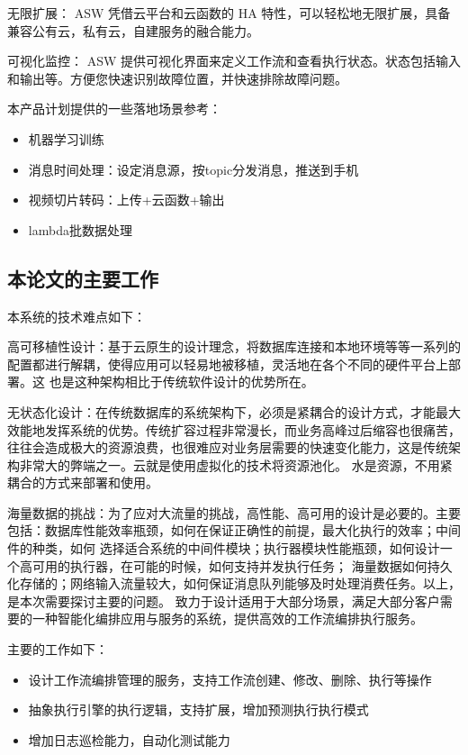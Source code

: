 无限扩展：
ASW 凭借云平台和云函数的 HA 特性，可以轻松地无限扩展，具备兼容公有云，私有云，自建服务的融合能力。

可视化监控：
ASW 提供可视化界面来定义工作流和查看执行状态。状态包括输入和输出等。方便您快速识别故障位置，并快速排除故障问题。


本产品计划提供的一些落地场景参考：

    \begin{itemize}
        \item 机器学习训练
        \item 消息时间处理：设定消息源，按topic分发消息，推送到手机
        \item 视频切片转码：上传+云函数+输出
        \item lambda批数据处理
    \end{itemize}



\subsection{本论文的主要工作}

本系统的技术难点如下：

高可移植性设计：基于云原生的设计理念，将数据库连接和本地环境等等一系列的配置都进行解耦，使得应用可以轻易地被移植，灵活地在各个不同的硬件平台上部署。这
也是这种架构相比于传统软件设计的优势所在\cite{othe2}。

无状态化设计：在传统数据库的系统架构下，必须是紧耦合的设计方式，才能最大效能地发挥系统的优势。传统扩容过程非常漫长，而业务高峰过后缩容也很痛苦，
往往会造成极大的资源浪费，也很难应对业务层需要的快速变化能力，这是传统架构非常大的弊端之一\cite{kube2021near}。云就是使用虚拟化的技术将资源池化。
水是资源，不用紧耦合的方式来部署和使用\cite{roberson2021dbspdrp}。

海量数据的挑战：为了应对大流量的挑战，高性能、高可用的设计是必要的。主要包括：数据库性能效率瓶颈，如何在保证正确性的前提，最大化执行的效率；中间件的种类，如何
选择适合系统的中间件模块；执行器模块性能瓶颈，如何设计一个高可用的执行器，在可能的时候，如何支持并发执行任务；
海量数据如何持久化存储的；网络输入流量较大，如何保证消息队列能够及时处理消费任务。以上，是本次需要探讨主要的问题。
致力于设计适用于大部分场景，满足大部分客户需要的一种智能化编排应用与服务的系统，提供高效的工作流编排执行服务。

主要的工作如下：
\begin{itemize}
    \item 设计工作流编排管理的服务，支持工作流创建、修改、删除、执行等操作
    \item 抽象执行引擎的执行逻辑，支持扩展，增加预测执行执行模式
    \item 增加日志巡检能力，自动化测试能力
\end{itemize}

